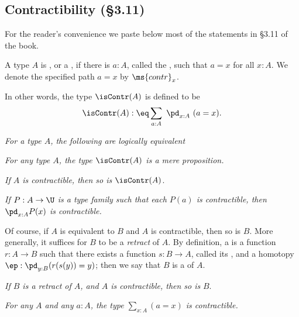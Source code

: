 \documentclass[12pt]{article}
\begin{document}

\subsection{Contractibility (\S3.11)}\label{311}


For the reader's convenience we paste below most of the statements in \S3.11 of the book.

\nn{} A type $A$ is , or a , if there is $a:A$, called the , such that $a=x$ for all $x:A$. We denote the specified path $a=x$ by $\ms{contr}_x$.

In other words, the type $\isContr(A)$ is defined to be
$$
\isContr(A):\eq\sum_{a:A}\ \pd_{x:A}\ (a=x).
$$

\nn{} \emph{For a type $A$, the following are logically equivalent}

\nn{} \emph{For any type $A$, the type $\isContr(A)$ is a mere proposition.}

\nn{} \emph{If $A$ is contractible, then so is} $\isContr(A)$.

\nn{} \emph{If $P:A\to\U$ is a type family such that each $P(a)$ is contractible, then $\pd_{x:A}P(x)$ is contractible.}

Of course, if $A$ is equivalent to $B$ and $A$ is contractible, then so is $B$. More generally, it suffices for $B$ to be a \emph{retract} of $A$. By definition, a  is a function $r:A\to B$ such that there exists a function $s:B\to A$, called its , and a homotopy $\ep:\pd_{y:B}(r(s(y))=y)$; then we say that $B$ is a  of $A$.

\nn{} \emph{If $B$ is a retract of $A$, and $A$ is contractible, then so is} $B$.

\nn{} \emph{For any $A$ and any $a:A$, the type $\sum_{x:A}(a=x)$ is contractible.}
\end{document}
